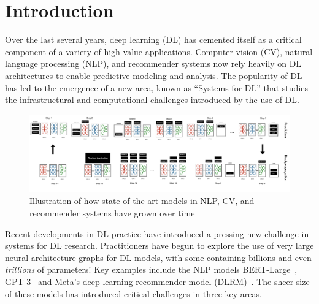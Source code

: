 

\section{Introduction}
\label{sec:intro}
Over the last several years, deep learning (DL) has cemented itself as a critical component of a variety of high-value applications.
Computer vision (CV), natural language processing (NLP), and recommender systems now rely heavily on DL architectures to 
enable predictive modeling and analysis. The popularity of DL has led to the emergence of a new area, known as ``Systems for DL''
that studies the infrastructural and computational challenges introduced by the use of DL. 

\begin{figure}[th!]
\centering
	\includegraphics[keepaspectratio=true, width=\linewidth]{images/model_parallel_pipeline_parallel}
	\caption{Illustration of how state-of-the-art models in NLP, CV, and recommender systems have grown over time}
	\label{fig:scaling}
\end{figure}

Recent developments in DL practice have introduced a pressing new challenge in systems for DL research. Practitioners
have begun to explore the use of very large neural architecture graphs for DL models, with some containing billions and 
even \textit{trillions} of parameters! Key examples include the NLP models BERT-Large~\cite{bert2018}, GPT-3~\cite{gpt2020}
and Meta's deep learning recommender model (DLRM)~\cite{dlrm2019}. The sheer size of these models has introduced critical challenges in three key areas.

